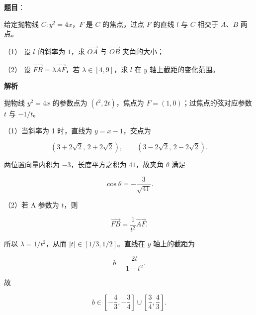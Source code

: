 \begin{answer}

\textbf{题目}：

给定抛物线 $C:y^2=4x$，$F$ 是 $C$ 的焦点，过点 $F$ 的直线 $l$ 与 $C$ 相交于 $A\text{、}B$ 两点。

（1） 设 $l$ 的斜率为 $1$，求 $\overrightarrow{OA}$ 与 $\overrightarrow{OB}$ 夹角的大小；

（2） 设 $\overrightarrow{FB}=\lambda\overrightarrow{AF}$，若 $\lambda\in[4,9]$，求 $l$ 在 $y$ 轴上截距的变化范围。

\textbf{解析}


抛物线 $y^2=4x$ 的参数点为 $(t^2,2t)$，焦点为 $F=(1,0)$；过焦点的弦对应参数 $t$ 与 $-1/t$。

（1）当斜率为 1 时，直线为 $y=x-1$，交点为

\nopagebreak[4]
\[
(3+2\sqrt2,\,2+2\sqrt2),\qquad
(3-2\sqrt2,\,2-2\sqrt2).
\]

两位置向量内积为 $-3$，长度平方之积为 $41$，故夹角 $\theta$ 满足

\nopagebreak[4]
\[
\cos\theta=-\frac3{\sqrt{41}}.
\]


（2）若 A 参数为 $t$，则

\nopagebreak[4]
\[
\overrightarrow{FB}
=\frac1{t^2}\overrightarrow{AF}.
\]

所以 $\lambda=1/t^2$，从而 $|t|\in[1/3,1/2]$。直线在 $y$ 轴上的截距为

\nopagebreak[4]
\[
b=\frac{2t}{1-t^2}.
\]

故

\nopagebreak[4]
\[
b\in\left[-\frac43,-\frac34\right]\cup
\left[\frac34,\frac43\right].
\]



\end{answer}
